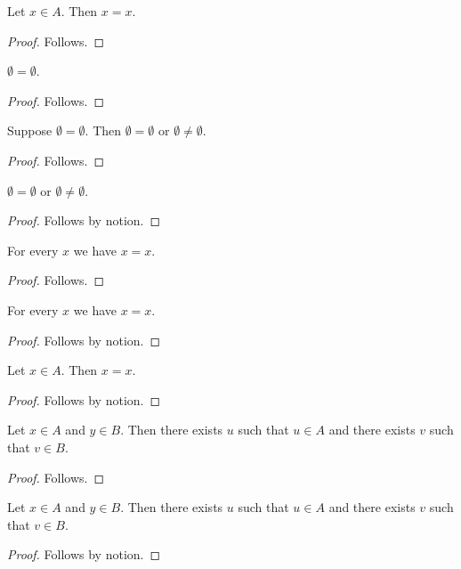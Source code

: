 \begin{classification}\label{whole_membership_reflexive}
    Let $x\in A$.
    Then $x=x$.
\end{classification}
\begin{proof}
    Follows.
\end{proof}

\begin{classification}\label{whole_closed_reflexive}
    $\emptyset=\emptyset$.
\end{classification}
\begin{proof}
    Follows.
\end{proof}

\begin{classification}\label{whole_closed_guarded}
    Suppose $\emptyset=\emptyset$.
    Then $\emptyset=\emptyset$ or $\emptyset\neq\emptyset$.
\end{classification}
\begin{proof}
    Follows.
\end{proof}

\begin{proposition}\label{whole_closed_consumer}
    $\emptyset=\emptyset$ or $\emptyset\neq\emptyset$.
\end{proposition}
\begin{proof}
    Follows by notion.
\end{proof}

\begin{classification}\label{whole_closed_universal}
    For every $x$ we have $x=x$.
\end{classification}
\begin{proof}
    Follows.
\end{proof}

\begin{proposition}\label{whole_closed_universal_consumer}
    For every $x$ we have $x=x$.
\end{proposition}
\begin{proof}
    Follows by notion.
\end{proof}

\begin{proposition}\label{whole_membership_consumer}
    Let $x\in A$.
    Then $x=x$.
\end{proposition}
\begin{proof}
    Follows by notion.
\end{proof}

\begin{classification}\label{whole_collective_inhabited}
    Let $x\in A$ and $y\in B$.
    Then there exists $u$ such that $u\in A$ and
        there exists $v$ such that $v\in B$.
\end{classification}
\begin{proof}
    Follows.
\end{proof}

\begin{proposition}\label{whole_collective_consumer}
    Let $x\in A$ and $y\in B$.
    Then there exists $u$ such that $u\in A$ and
        there exists $v$ such that $v\in B$.
\end{proposition}
\begin{proof}
    Follows by notion.
\end{proof}
